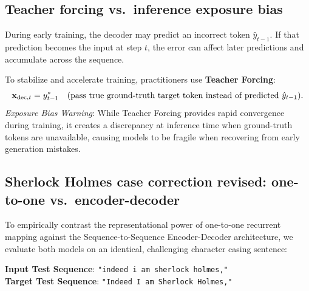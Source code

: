 \documentclass[../../main.tex]{subfiles}
\begin{document}
\subsection{Teacher forcing vs.~inference exposure bias}
During early training, the decoder may predict an incorrect token $\hat{y}_{t-1}$. If that prediction becomes the input at step $t$, the error can affect later predictions and accumulate across the sequence.

To stabilize and accelerate training, practitioners use \textbf{Teacher Forcing}:
\begin{equation}
\label{eq:teacher_forcing}
\mathbf{x}_{\text{dec}, t} = y_{t-1}^* \quad (\text{pass true ground-truth target token instead of predicted } \hat{y}_{t-1}).
\end{equation}
\emph{Exposure Bias Warning}: While Teacher Forcing provides rapid convergence during training, it creates a discrepancy at inference time when ground-truth tokens are unavailable, causing models to be fragile when recovering from early generation mistakes.

\subsection{Sherlock Holmes case correction revised: one-to-one vs.~encoder-decoder}
\label{subsec:sherlock_seq2seq_comparison}

To empirically contrast the representational power of one-to-one recurrent mapping against the Sequence-to-Sequence Encoder-Decoder architecture, we evaluate both models on an identical, challenging character casing sentence:
\begin{center}
\textbf{Input Test Sequence}: \texttt{"indeed i am sherlock holmes,"} \\
\textbf{Target Test Sequence}: \texttt{"Indeed I am Sherlock Holmes,"}
\end{center}
\end{document}

